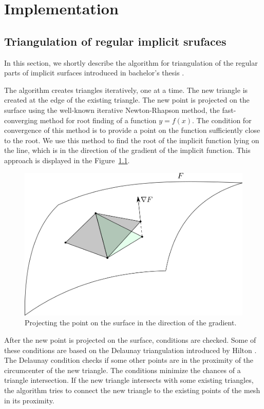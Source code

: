 \chapter{Implementation}
\label{chap3}

\section{Triangulation of regular implicit srufaces}
\label{triangulation-implicit}

In this section, we shortly describe the algorithm for triangulation of the regular
parts of implicit surfaces introduced in bachelor's thesis \cite{korecova2021triangulation}.

The algorithm creates triangles iteratively, one at a time. The new triangle is
created at the edge of the existing triangle. The new point is projected on the
surface using the well-known iterative Newton-Rhapson method, the 
fast-converging method for root finding of a function $y=f(x)$. The condition 
for convergence of this method is to provide a point on the function sufficiently
close to the root. We use this method to find the root of the implicit
function lying on the line, which is in the direction of the gradient of the implicit
function. This approach is displayed in the Figure~\ref{img:29}.
\begin{figure}
    \centerline{\includegraphics[scale=0.5]{images/img29}}
    \caption[Projecting the point on the surface]
    {Projecting the point on the surface in the direction of the gradient.}
    \label{img:29}
\end{figure}

After the new point is projected on the surface, conditions are checked. 
Some of these conditions are based on the Delaunay triangulation introduced
by Hilton \cite{hilton1996marching}. The Delaunay condition checks
if some other points are in the proximity of the circumcenter of the new triangle.
The conditions minimize the chances of a triangle intersection.
If the new triangle intersects with some existing triangles, the algorithm
tries to connect the new triangle to the existing points of the mesh in its proximity.

